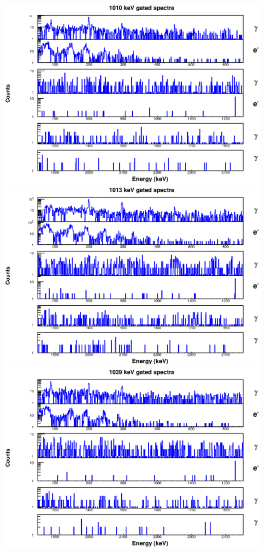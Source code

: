 \begin{landscape}
\includegraphics[scale=1.1]{156Gd_Appendix/1010_combined.eps}
\includegraphics[scale=1.1]{156Gd_Appendix/1013_combined.eps}
\includegraphics[scale=1.1]{156Gd_Appendix/1039_combined.eps}

\end{landscape}
